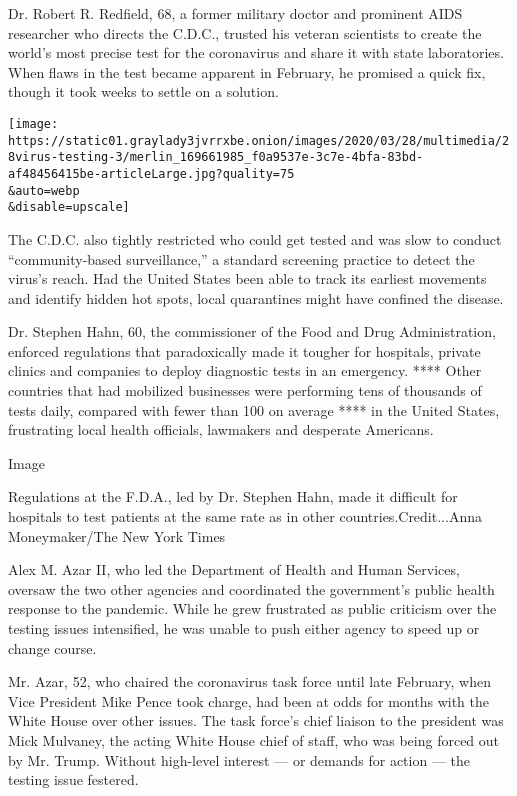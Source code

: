 Dr. Robert R. Redfield, 68, a former military doctor and prominent AIDS
researcher who directs the C.D.C., trusted his veteran scientists to
create the world's most precise test for the coronavirus and share it
with state laboratories. When flaws in the test became apparent in
February, he promised a quick fix, though it took weeks to settle on a
solution.

\texttt{[image: https://static01.graylady3jvrrxbe.onion/images/2020/03/28/multimedia/28virus-testing-3/merlin\_169661985\_f0a9537e-3c7e-4bfa-83bd-af48456415be-articleLarge.jpg?quality=75\\\&auto=webp\\\&disable=upscale]}

The C.D.C. also tightly restricted who could get tested and was slow to
conduct ``community-based surveillance,'' a standard screening practice
to detect the virus's reach. Had the United States been able to track
its earliest movements and identify hidden hot spots, local quarantines
might have confined the disease.

Dr. Stephen Hahn, 60, the commissioner of the Food and Drug
Administration, enforced regulations that paradoxically made it tougher
for hospitals, private clinics and companies to deploy diagnostic tests
in an emergency. **** Other countries that had mobilized businesses were
performing tens of thousands of tests daily, compared with fewer than
100 on average **** in the United States, frustrating local health
officials, lawmakers and desperate Americans.

Image

Regulations at the F.D.A., led by Dr. Stephen Hahn, made it difficult
for hospitals to test patients at the same rate as in other
countries.Credit...Anna Moneymaker/The New York Times

Alex M. Azar II, who led the Department of Health and Human Services,
oversaw the two other agencies and coordinated the government's public
health response to the pandemic. While he grew frustrated as public
criticism over the testing issues intensified, he was unable to push
either agency to speed up or change course.

Mr. Azar, 52, who chaired the coronavirus task force until late
February, when Vice President Mike Pence took charge, had been at odds
for months with the White House over other issues. The task force's
chief liaison to the president was Mick Mulvaney, the acting White House
chief of staff, who was being forced out by Mr. Trump. Without
high-level interest --- or demands for action --- the testing issue
festered.


